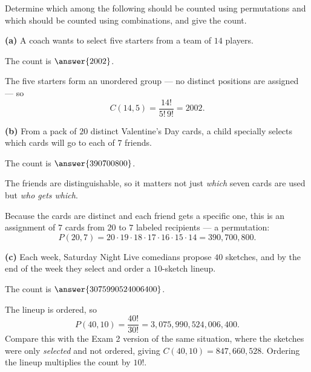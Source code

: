 \documentclass[12pt]{ximera}
\begin{document}
\begin{problem}
Determine which among the following should be counted using permutations and which
should be counted using combinations, and give the count.

\begin{prompt}
\textbf{(a)} A coach wants to select five starters from a team of $14$ players.

\begin{multipleChoice}
\end{multipleChoice}

The count is $\answer{2002}$.

\begin{feedback}
The five starters form an unordered group --- no distinct positions are assigned --- so
\[ C(14,5)=\frac{14!}{5!\,9!}=2002. \]
\end{feedback}
\end{prompt}

\begin{prompt}
\textbf{(b)} From a pack of $20$ distinct Valentine's Day cards, a child specially
selects which cards will go to each of $7$ friends.

\begin{multipleChoice}
\end{multipleChoice}

The count is $\answer{390700800}$.

\begin{hint}
The friends are distinguishable, so it matters not just \emph{which} seven cards are
used but \emph{who gets which}.
\end{hint}

\begin{feedback}
Because the cards are distinct and each friend gets a specific one, this is an
assignment of $7$ cards from $20$ to $7$ labeled recipients --- a permutation:
\[ P(20,7)=20\cdot 19\cdot 18\cdot 17\cdot 16\cdot 15\cdot 14 = 390{,}700{,}800. \]
\end{feedback}
\end{prompt}

\begin{prompt}
\textbf{(c)} Each week, Saturday Night Live comedians propose $40$ sketches, and by
the end of the week they select and order a $10$-sketch lineup.

\begin{multipleChoice}
\end{multipleChoice}

The count is $\answer{3075990524006400}$.

\begin{feedback}
The lineup is ordered, so
\[ P(40,10)=\frac{40!}{30!}=3{,}075{,}990{,}524{,}006{,}400. \]
Compare this with the Exam 2 version of the same situation, where the sketches were
only \emph{selected} and not ordered, giving $C(40,10)=847{,}660{,}528$. Ordering the
lineup multiplies the count by $10!$.
\end{feedback}
\end{prompt}
\end{problem}
\end{document}
